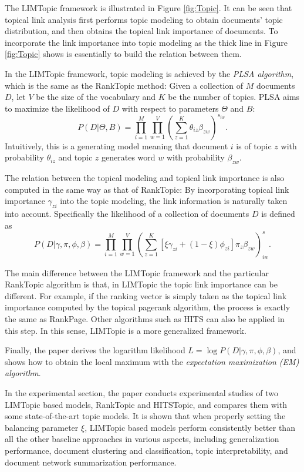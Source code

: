 \documentclass[paper=a4, fontsize=18pt]{article} %
\numberwithin{equation}{section} %
\numberwithin{figure}{section} %
\numberwithin{table}{section} %
\begin{document}
The LIMTopic framework is illustrated in Figure \ref{fig:Topic}. It can be seen that topical link analysis first performs topic modeling to obtain documents' topic distribution, and then obtains the topical link importance of documents. To incorporate the link importance into topic modeling as the thick line in Figure \ref{fig:Topic} shows is essentially to build the relation between them.

In the LIMTopic framework, topic modeling is achieved by the \emph{PLSA algorithm}, which is the same as the RankTopic method:
Given a collection of $M$ documents $D$, let $V$ be the size of the vocabulary and $K$ be the number of topics. PLSA aims to maximize the likelihood of $D$ with respect to parameters $\Theta$ and $B$:
$$P(D|\Theta,B) = \prod^M_{i=1} \prod^V_{w=1} (\sum_{z=1}^K \theta_{iz} \beta_{zw})^{s_{iw}}.$$
Intuitively, this is a generating model meaning that document $i$ is of topic $z$ with probability $\theta_{iz}$ and topic $z$ generates word $w$ with probability $\beta_{zw}$.

The relation between the topical modeling and topical link importance is also computed in the same way as that of RankTopic: By incorporating topical link importance $\gamma_{zi}$ into the topic modeling, the link information is naturally taken into account. Specifically the likelihood of a collection of documents $D$ is defined as
$$P(D|\gamma, \pi, \phi, \beta) = \prod^M_{i=1} \prod^V_{w=1} (\sum_{z=1}^K [\xi \gamma_{zi} + (1-\xi)\phi_{zi}]\pi_z \beta_{zw})^s_{iw}.$$

The main difference between the LIMTopic framework and the particular RankTopic algorithm is that, in LIMTopic the topic link importance can be different. For example, if the ranking vector is simply taken as the topical link importance computed by the topical pagerank algorithm, the process is exactly the same as RankPage. Other algorithms such as HITS \cite{K99} can also be applied in this step. In this sense, LIMTopic is a more generalized framework.

Finally, the paper derives the logarithm likelihood $L = \log P(D | \gamma, \pi, \phi, \beta)$, and shows how to obtain the local maximum with the \emph{expectation maximization (EM) algorithm}.

In the experimental section, the paper conducts experimental studies of two LIMTopic based models, RankTopic and HITSTopic, and compares them with some state-of-the-art topic models. It is shown that when properly setting the balancing parameter $\xi$, LIMTopic based models perform consistently better than all the other baseline approaches in various aspects, including generalization performance, document clustering and classification, topic interpretability, and document network summarization performance.
\end{document}
